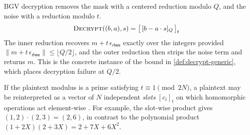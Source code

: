 \begin{definition}
    \label{def:decrypt-bgv}
    BGV decryption removes the mask with a centered reduction modulo $Q$, and the noise with a reduction modulo $t$.
    \begin{equation}
        \Call{Decrypt}{(b, a), s} = \big[\, [b - a \cdot s]_Q \,\big]_t
    \end{equation}
    The inner reduction recovers $m + t\,\epsilon_{\mathsf{rlwe}}$ exactly over the integers provided $\|m + t\,\epsilon_{\mathsf{rlwe}}\| \leq \lfloor Q/2 \rfloor$, and the outer reduction then strips the noise term and returns $m$. This is the concrete instance of the bound in \autoref{def:decrypt-generic}, which places decryption failure at $Q/2$.
\end{definition}

\begin{definition}
    \label{def:simd}
    If the plaintext modulus is a prime satisfying $t \equiv 1 \pmod{2N}$, a plaintext may be reinterpreted as a vector of $N$ independent \emph{slots} $[c_i]_t$ on which homomorphic operations act element-wise \cite{cryptoeprint:2011/133}. For example, the slot-wise product gives $(1, 2) \cdot (2, 3) = (2, 6)$, in contrast to the polynomial product $(1 + 2X)(2 + 3X) = 2 + 7X + 6X^2$.
\end{definition}

